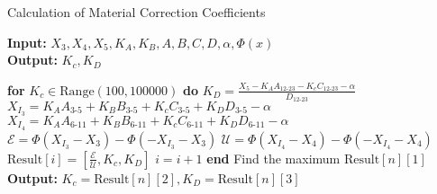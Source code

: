 \documentclass{article}
\begin{document}
\renewcommand{\algorithmicrequire}{\textbf{Input:}}
\renewcommand{\algorithmicensure}{\textbf{Output:}}

\begin{algorithm}
\caption{Calculation of Material Correction Coefficients}
\textbf{Input:} $X_3, X_4, X_5, K_A, K_B, A, B, C, D, \alpha, \Phi(x)$\\
\textbf{Output:} $K_c, K_D$
\begin{algorithmic}
\State \textbf{for} $K_c \in \text{Range}(100, 100000)$ \textbf{do}
    \State \hspace{1em} $K_D = \frac{X_5 - K_A A_{12\text{-}23} - K_c C_{12\text{-}23} - \alpha}{D_{12\text{-}23}}$
    \State \hspace{1em} $X_{I_3} = K_A A_{3\text{-}5} + K_B B_{3\text{-}5} + K_c C_{3\text{-}5} + K_D D_{3\text{-}5} - \alpha$
    \State \hspace{1em} $X_{I_4} = K_A A_{6\text{-}11} + K_B B_{6\text{-}11} + K_c C_{6\text{-}11} + K_D D_{6\text{-}11} - \alpha$
    \State \hspace{1em} $\mathcal{E} = \Phi(X_{I_3} - X_3) - \Phi(-X_{I_3} - X_3)$
    \State \hspace{1em} $\mathcal{U} = \Phi(X_{I_4} - X_4) - \Phi(-X_{I_4} - X_4)$
    \State \hspace{1em} $\text{Result}[i] = \left[ \frac{\mathcal{E}}{\mathcal{U}}, K_c, K_D \right]$
    \State \hspace{1em} $i = i + 1$
\State \textbf{end}
\State Find the maximum $\text{Result}[n][1]$
\State \textbf{Output:} $K_c = \text{Result}[n][2], K_D = \text{Result}[n][3]$
\end{algorithmic}
\end{algorithm}
\end{document}

